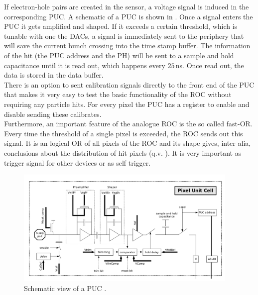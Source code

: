 \documentclass[british,11pt,a4paper]{memoir}
\begin{document}
If electron-hole pairs are created in the sensor, a voltage signal is induced in the corresponding \ac{PUC}. A schematic of a \ac{PUC} is shown in . Once a signal enters the \ac{PUC} it gets amplified and shaped. If it exceeds a certain threshold, which is tunable with one the \ac{DAC}s, a signal is immediately sent to the periphery that will save the current bunch crossing into the time stamp buffer. The information of the hit (the \ac{PUC} address and the \ac{PH}) will be sent to a sample and hold capacitance until it is read out, which happens every $25\,$ns. Once read out, the data is stored in the data buffer.\\ 
There is an option to sent calibration signals directly to the front end of the \ac{PUC} that makes it very easy to test the basic functionality of the \ac{ROC} without requiring any particle hits. For every pixel the \ac{PUC} has a register to enable and disable sending these calibrates.\\
Furthermore, an important feature of the analogue \ac{ROC} is the so called fast-OR. Every time the threshold of a single pixel is exceeded, the \ac{ROC} sends out this signal. It is an logical OR of all pixels of the \ac{ROC} and its shape gives, inter alia, conclusions about the distribution of hit pixels (q.v. ). It is very important as trigger signal for other devices or as self trigger.
\begin{figure}[ht]
	\includegraphics[width=0.95\textwidth]{PUC}
	\caption{Schematic view of a \ac{PUC} \cite{dambach}.}
	\label{p9}
\end{figure}
\end{document}
